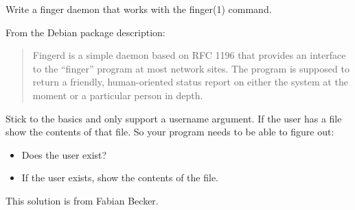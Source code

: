 \begin{Exercise}[title={Finger daemon},difficulty=1]
\label{ex:finger}
\Question
Write a finger daemon that works with the finger(1) command. 

From the Debian package description:
\begin{quote}
Fingerd is a simple daemon based on RFC 1196 \cite{RFC1196} that provides an interface to the
``finger'' program at most network sites.  The program is supposed to return a
friendly, human-oriented status report on either the system at the moment or a
particular person in depth.
\end{quote}

Stick to the basics and only support a username argument. If the user has a  file
show the contents of that file. So your program needs to be able to figure out:
\begin{itemize}
\item Does the user exist?
\item If the user exists, show the contents of the  file.
\end{itemize}
\end{Exercise}

\begin{Answer}
\begin{lbar}
This solution is from Fabian Becker.
\end{lbar}
\Question

\end{Answer}
